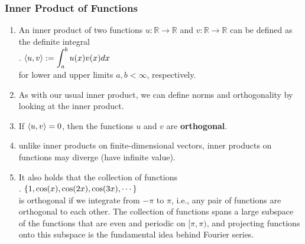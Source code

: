 \subsubsection{Inner Product of Functions}


\begin{enumerate}
    \item An inner product of two functions $u : \mathbb{R} \to \mathbb{R}$ and $v : \mathbb{R} \to \mathbb{R}$ can be defined as the definite integral
    \hfill \cite{mfml/book/mml/Deisenroth-Faisal-Ong}
    \\
    .\hfill
    $
        \langle u, v\rangle
        := \displaystyle\int^b_a u(x)v(x) dx
    $
    \hfill \cite{mfml/book/mml/Deisenroth-Faisal-Ong}
    \\
    for lower and upper limits $a, b < \infty$, respectively.
    \hfill \cite{mfml/book/mml/Deisenroth-Faisal-Ong}

    \item As with our usual inner product, we can define norms and orthogonality by looking at the inner product.
    \hfill \cite{mfml/book/mml/Deisenroth-Faisal-Ong}

    \item If $\langle u, v\rangle = 0$, then the functions $u$ and $v$ are \textbf{orthogonal}.
    \hfill \cite{mfml/book/mml/Deisenroth-Faisal-Ong}

    \item unlike inner products on finite-dimensional vectors, inner products on functions may diverge (have infinite value).
    \hfill \cite{mfml/book/mml/Deisenroth-Faisal-Ong}

    \item It also holds that the collection of functions
    \hfill \cite{mfml/book/mml/Deisenroth-Faisal-Ong}
    \\
    .\hfill
    $
        \left\{1, \cos(x), \cos(2x), \cos(3x), \cdots \right\}
    $
    \hfill \cite{mfml/book/mml/Deisenroth-Faisal-Ong}
    \\
    is orthogonal if we integrate from $-\pi$ to $\pi$, i.e., any pair of functions are orthogonal to each other.
    The collection of functions spans a large subspace of the functions that are even and periodic on $[\pi, \pi)$, and projecting functions onto this subspace is the fundamental idea behind Fourier series.
    \hfill \cite{mfml/book/mml/Deisenroth-Faisal-Ong}

    
\end{enumerate}

























